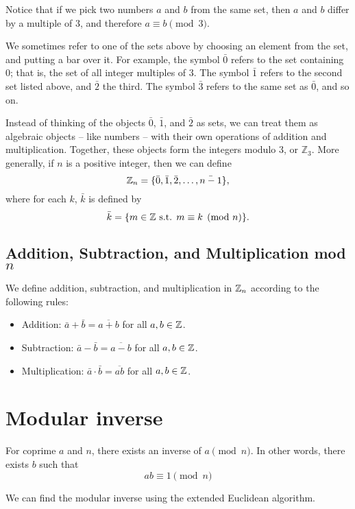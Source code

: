 Notice that if we pick two numbers $a$ and $b$ from the same set, then $a$ and $b$ differ by a multiple of $3$, and therefore $a \equiv b \pmod{3}.$

We sometimes refer to one of the sets above by choosing an element from the set, and putting a bar over it. For example, the symbol $\bar{0}$ refers to the set containing $0$; that is, the set of all integer multiples of $3$. The symbol $\bar{1}$ refers to the second set listed above, and $\bar{2}$ the third. The symbol $\bar{3}$ refers to the same set as $\bar{0}$, and so on.

Instead of thinking of the objects $\bar{0}$, $\bar{1}$, and $\bar{2}$ as sets, we can treat them as algebraic objects -- like numbers -- with their own operations of addition and multiplication. Together, these objects form the integers modulo $3$, or $\mathbb{Z}_3$. More generally, if $n$ is a positive integer, then we can define
\[ \mathbb Z_n = \{\bar{0}, \bar{1}, \bar{2}, \ldots, \bar{n-1} \}, \]
where for each $k$, $\bar{k}$ is defined by
\[ \bar{k} = \{ m \in \mathbb Z \text{ s.t. } m \equiv k \pmod n \}. \]

\subsection{Addition, Subtraction, and Multiplication mod $n$}
We define addition, subtraction, and multiplication in $\mathbb Z_n$ according to the following rules:
\begin{itemize}
\item Addition: $\bar{a} + \bar{b} = \overline{a+b}$ for all $a, b \in \mathbb Z$.
\item Subtraction: $\bar{a} - \bar{b} = \overline{a-b}$ for all $a, b \in \mathbb Z$.
\item Multiplication: $\bar{a} \cdot \bar{b} = \overline{ab}$ for all $a, b \in \mathbb Z$.
\end{itemize}
\pagebreak

\section{Modular inverse}
For coprime $a$ and $n$, there exists an inverse of $a \pmod n$. In other words, there exists $b$ such that 
\[ ab \equiv 1 \pmod n \]

We can find the modular inverse using the extended Euclidean algorithm.

